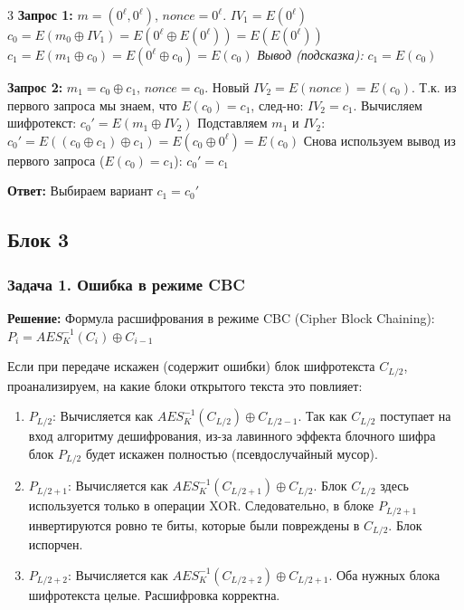 ﻿\documentclass[9pt,a4paper,landscape]{extarticle}
\newcommand{\tightlist}{}
\begin{document}
\begin{multicols*}{3}
\textbf{Запрос 1:} \(m = (0^\ell, 0^\ell)\), \(nonce = 0^\ell\). \(IV_1 = E(0^\ell)\) \(c_0 = E(m_0 \oplus IV_1) = E(0^\ell \oplus E(0^\ell)) = E(E(0^\ell))\) \(c_1 = E(m_1 \oplus c_0) = E(0^\ell \oplus c_0) = E(c_0)\) \emph{Вывод (подсказка):} \textbf{\(c_1 = E(c_0)\)}

\textbf{Запрос 2:} \(m_1 = c_0 \oplus c_1\), \(nonce = c_0\). Новый \(IV_2 = E(nonce) = E(c_0)\). Т.к. из первого запроса мы знаем, что \(E(c_0) = c_1\), след-но: \textbf{\(IV_2 = c_1\)}. Вычисляем шифротекст: \(c_0' = E(m_1 \oplus IV_2)\) Подставляем \(m_1\) и \(IV_2\): \(c_0' = E((c_0 \oplus c_1) \oplus c_1) = E(c_0 \oplus 0^\ell) = E(c_0)\) Снова используем вывод из первого запроса (\(E(c_0) = c_1\)): \textbf{\(c_0' = c_1\)}

\textbf{Ответ:} Выбираем вариант \textbf{\(c_1 = c_0'\)}

\subsection{Блок 3}\label{ux431ux43bux43eux43a-3}

\subsubsection{Задача 1. Ошибка в режиме CBC}\label{ux437ux430ux434ux430ux447ux430-1.-ux43eux448ux438ux431ux43aux430-ux432-ux440ux435ux436ux438ux43cux435-cbc}

\textbf{Решение:} Формула расшифрования в режиме CBC (Cipher Block Chaining): \(P_i = AES^{-1}_K(C_i) \oplus C_{i-1}\)

Если при передаче искажен (содержит ошибки) блок шифротекста \(C_{L/2}\), проанализируем, на какие блоки открытого текста это повлияет:

\begin{enumerate}
\def\labelenumi{\arabic{enumi}.}
\tightlist
\item
  \textbf{\(P_{L/2}\)}: Вычисляется как \(AES^{-1}_K(C_{L/2}) \oplus C_{L/2 - 1}\). Так как \(C_{L/2}\) поступает на вход алгоритму дешифрования, из-за лавинного эффекта блочного шифра блок \(P_{L/2}\) будет искажен полностью (псевдослучайный мусор).
\item
  \textbf{\(P_{L/2 + 1}\)}: Вычисляется как \(AES^{-1}_K(C_{L/2 + 1}) \oplus C_{L/2}\). Блок \(C_{L/2}\) здесь используется только в операции XOR. Следовательно, в блоке \(P_{L/2 + 1}\) инвертируются ровно те биты, которые были повреждены в \(C_{L/2}\). Блок испорчен.
\item
  \textbf{\(P_{L/2 + 2}\)}: Вычисляется как \(AES^{-1}_K(C_{L/2 + 2}) \oplus C_{L/2 + 1}\). Оба нужных блока шифротекста целые. Расшифровка корректна.
\end{enumerate}


\end{multicols*}
\end{document}
